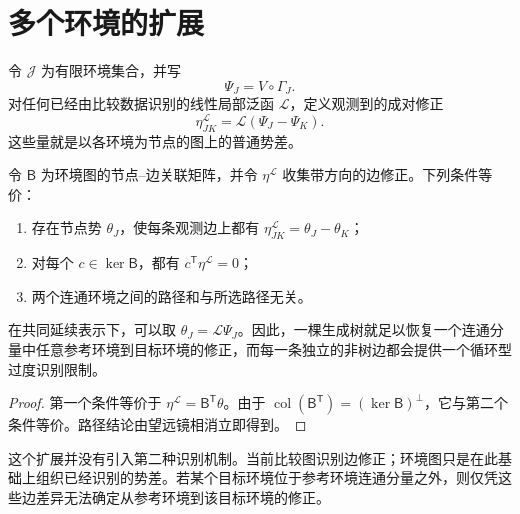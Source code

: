 \section{多个环境的扩展}
\label{sec:environment-network}

令 $\mathcal J$ 为有限环境集合，并写
\[
\Psi_J=V\circ\Gamma_J.
\]
对任何已经由比较数据识别的线性局部泛函 $\mathcal L$，定义观测到的成对修正
\[
\eta_{JK}^{\mathcal L}=\mathcal L(\Psi_J-\Psi_K).
\]
这些量就是以各环境为节点的图上的普通势差。

\begin{proposition}[路径无关性]
\label{thm:path-independence}
令 $\mathsf B$ 为环境图的节点--边关联矩阵，并令 $\eta^{\mathcal L}$ 收集带方向的边修正。下列条件等价：
\begin{enumerate}[label=(\roman*)]
\item 存在节点势 $\theta_J$，使每条观测边上都有 $\eta_{JK}^{\mathcal L}=\theta_J-\theta_K$；
\item 对每个 $c\in\ker\mathsf B$，都有 $c^{\mathsf T}\eta^{\mathcal L}=0$；
\item 两个连通环境之间的路径和与所选路径无关。
\end{enumerate}
在共同延续表示下，可以取 $\theta_J=\mathcal L\Psi_J$。因此，一棵生成树就足以恢复一个连通分量中任意参考环境到目标环境的修正，而每一条独立的非树边都会提供一个循环型过度识别限制。
\end{proposition}

\begin{proof}
第一个条件等价于 $\eta^{\mathcal L}=\mathsf B^{\mathsf T}\theta$。由于
$\operatorname{col}(\mathsf B^{\mathsf T})=(\ker\mathsf B)^\perp$，它与第二个条件等价。路径结论由望远镜相消立即得到。
\end{proof}

这个扩展并没有引入第二种识别机制。当前比较图识别边修正；环境图只是在此基础上组织已经识别的势差。若某个目标环境位于参考环境连通分量之外，则仅凭这些边差异无法确定从参考环境到该目标环境的修正。
